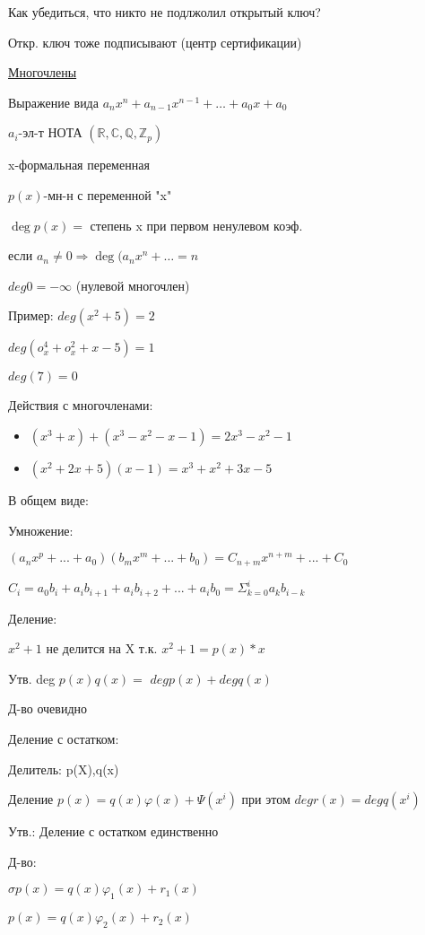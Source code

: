 \documentclass{article}
\begin{document}
Как убедиться, что никто не подлжолил открытый ключ? 

Откр. ключ тоже подписывают (центр сертификации)

\underline{Многочлены}

Выражение вида $a_{n}x^n+a_{n-1}x^{n-1}+\dots+a_{0}x+a_{0}$

$a_{i}$-эл-т НОТА $(\mathds{R},\mathds{C},\mathds{Q},\mathds{Z}_{p})$

x-формальная переменная 

$p(x)$-мн-н с переменной "x"

$\deg p(x)=$ степень x при первом ненулевом коэф.

если $a_{n}\ne0\Longrightarrow \deg(a_{n}x^n+\dots=n$

$deg0=-\infty$ (нулевой многочлен)

Пример:
$deg(x^2+5)=2$

$deg(o_{x}^4+o_{x}^2+x-5)=1$

$deg(7)=0$

Действия с многочленами:

\begin{itemize}
	\item $(x^3+x)+(x^3-x^2-x-1)=2x^3-x^2-1$
	
    \item $(x^2+2x+5)(x-1)=x^3+x^2+3x-5$
\end{itemize}   

В общем виде:

Умножение:

$(a_{n}x^p+...+a_{0})(b_{m}x^m+...+b_{0})=C_{n+m}x^{n+m}+...+C_{0}$

$C_{i}=a_{0}b_{i}+a_{i}b_{i+1}+a_{i}b_{i+2}+...+a_{i}b_{0}=\Sigma^i_{k=0}a_{k}b_{i-k}$

Деление:

$x^2+1$ не делится на X т.к. $x^2+1=p(x)*x$

Утв. deg $p(x)q(x)=$ $degp(x)+degq(x)$

Д-во очевидно 

Деление с остатком:

Делитель: p(X),q(x)

Деление $p(x)=q(x)\varphi(x)+\Psi(x^i)$ при этом $deg r(x)=deg q(x^i)$

Утв.: Деление с остатком единственно

Д-во: 

$\sigma p(x)=q(x)\varphi_{1}(x)+r_{1}(x)$

$p(x)=q(x)\varphi_{2}(x)+r_{2}(x)$
\end{document}
